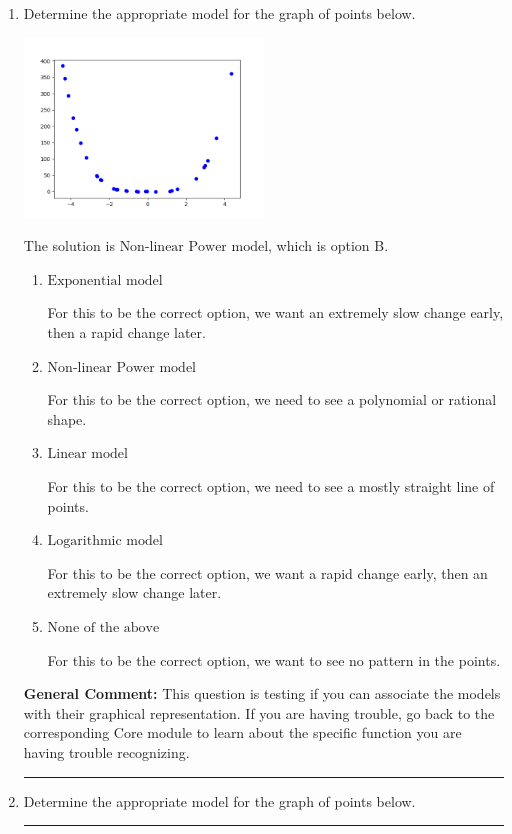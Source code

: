 \documentclass{extbook}[14pt]
\newcommand{\litem}[1]{\item #1

\rule{\textwidth}{0.4pt}}
\begin{document}
\begin{enumerate}\litem{
Determine the appropriate model for the graph of points below.

\begin{center}
    \includegraphics[width=0.5\textwidth]{../Figures/identifyModelGraph12A.png}
\end{center}




The solution is \( \text{Non-linear Power model} \), which is option B.\begin{enumerate}[label=\Alph*.]
\item \( \text{Exponential model} \)

For this to be the correct option, we want an extremely slow change early, then a rapid change later.
\item \( \text{Non-linear Power model} \)

For this to be the correct option, we need to see a polynomial or rational shape.
\item \( \text{Linear model} \)

For this to be the correct option, we need to see a mostly straight line of points.
\item \( \text{Logarithmic model} \)

For this to be the correct option, we want a rapid change early, then an extremely slow change later.
\item \( \text{None of the above} \)

For this to be the correct option, we want to see no pattern in the points.
\end{enumerate}

\textbf{General Comment:} This question is testing if you can associate the models with their graphical representation. If you are having trouble, go back to the corresponding Core module to learn about the specific function you are having trouble recognizing.
}
\litem{
Determine the appropriate model for the graph of points below.

}
\end{enumerate}
\end{document}
